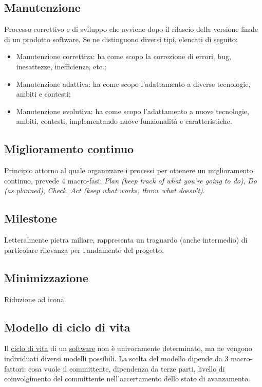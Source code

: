 	\subsection{Manutenzione}
	\label{sec:manutenzione}
	Processo correttivo e di sviluppo che avviene dopo il rilascio della versione finale di un prodotto software. Se ne distinguono diversi tipi, elencati di seguito:
	\begin{itemize}
		\item{Manutenzione correttiva: ha come scopo la correzione di errori, bug, inesattezze, inefficienze, etc.;}
		\item{Manutenzione adattiva: ha come scopo l'adattamento a diverse tecnologie, ambiti e contesti;}
		\item{Manutenzione evolutiva: ha come scopo l'adattamento a nuove tecnologie, ambiti, contesti, implementando nuove funzionalità e caratteristiche.}
	\end{itemize}


	\subsection{Miglioramento continuo}
	\label{sec:miglioramentocontinuo}
	Principio attorno al quale organizzare i processi per ottenere un miglioramento continuo, prevede 4 macro-fasi:
	\emph{Plan (keep track of what you're going to do)}, \emph{Do (as planned)}, \emph{Check}, \emph{Act (keep what works, throw what doesn't)}.


	\subsection{Milestone}
	\label{sec:milestone}
	Letteralmente pietra miliare, rappresenta un traguardo (anche intermedio) di particolare rilevanza per l'andamento del progetto.


	\subsection{Minimizzazione}
	\label{sec:minimizzazione}
	Riduzione ad icona.


	\subsection{Modello di ciclo di vita}
	\label{sec:modelliciclodivita}
	Il \underline{\hyperref[sec:ciclodivita]{ciclo di vita}} di un \underline{\hyperref[sec:prodottosoftware]{software}} non è univocamente determinato, ma ne vengono individuati diversi modelli possibili. La scelta del modello dipende da 3 macro-fattori: cosa vuole il committente, dipendenza da terze parti, livello di coinvolgimento del committente nell'accertamento dello stato di avanzamento.


